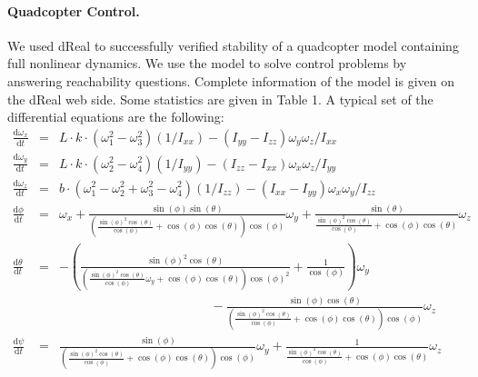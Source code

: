 \documentclass[10pt]{article}
\theoremstyle{definition}
\begin{document}
\paragraph{Quadcopter Control. } We used dReal to successfully verified stability of a quadcopter model containing full nonlinear dynamics. We use the model to solve control problems by answering reachability questions. Complete information of the model is given on the dReal web side. Some statistics are given in Table 1. A typical set of the differential equations are the following:
\begin{eqnarray*}
\frac{\mathrm{d}\omega_x}{\mathrm{d}t} &=& L\cdot k\cdot (\omega_1^2 - \omega_3^2)(1/I_{xx})-(I_{yy} - I_{zz})\omega_y\omega_z/I_{xx}\\
\frac{\mathrm{d}\omega_y}{\mathrm{d}t} &=& L\cdot k\cdot(\omega_2^2 - \omega_4^2)(1/I_{yy})-(I_{zz} - I_{xx})\omega_x\omega_z/I_{yy}\\
\frac{\mathrm{d}\omega_z}{\mathrm{d}t} &=& b\cdot(\omega_1^2 - \omega_2^2 + \omega_3^2 - \omega_4^2)(1/I_{zz})-(I_{xx} - I_{yy})\omega_x\omega_y/I_{zz}\\
\frac{\mathrm{d}\phi}{\mathrm{d}t} &=& \omega_x + \displaystyle{\frac{\sin\left(\phi\right) \sin\left(\theta\right)}{{\left(\frac{\sin\left(\phi\right)^{2} \cos\left(\theta\right)}{\cos\left(\phi\right)} + \cos\left(\phi\right) \cos\left(\theta\right)\right)} \cos\left(\phi\right)}}\omega_y + \displaystyle\frac{\sin\left(\theta\right)}{\frac{\sin\left(\phi\right)^{2} \cos\left(\theta\right)}{\cos\left(\phi\right)} + \cos\left(\phi\right) \cos\left(\theta\right)}\omega_z\\
\frac{\mathrm{d}\theta}{\mathrm{d}t} &=& -(\displaystyle\frac{\sin\left(\phi\right)^{2} \cos\left(\theta\right)}{{\left(\frac{\sin\left(\phi\right)^{2} \cos\left(\theta\right)}{\cos\left(\phi\right)}\omega_y + \cos\left(\phi\right) \cos\left(\theta\right)\right)} \cos\left(\phi\right)^{2}} + \frac{1}{\cos\left(\phi\right)})\omega_y\\
& &\hspace{5cm}-\displaystyle\frac{\sin\left(\phi\right) \cos\left(\theta\right)}{{\left(\frac{\sin\left(\phi\right)^{2} \cos\left(\theta\right)}{\cos\left(\phi\right)} + \cos\left(\phi\right) \cos\left(\theta\right)\right)} \cos\left(\phi\right)}\omega_z \\
\frac{\mathrm{d}\psi}{\mathrm{d}t} &=& \displaystyle\frac{\sin\left(\phi\right)}{{\left(\frac{\sin\left(\phi\right)^{2} \cos\left(\theta\right)}{\cos\left(\phi\right)} + \cos\left(\phi\right) \cos\left(\theta\right)\right)} \cos\left(\phi\right)}\omega_y + \displaystyle\frac{1}{\frac{\sin\left(\phi\right)^{2} \cos\left(\theta\right)}{\cos\left(\phi\right)} + \cos\left(\phi\right) \cos\left(\theta\right)}\omega_z\\

\end{eqnarray*}
\end{document}
